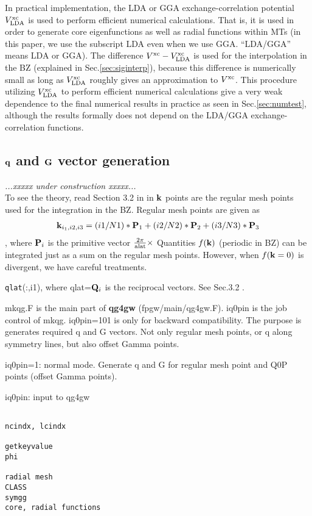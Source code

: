 \documentclass[a4paper,10pt,epsf,fleqn]{article}
\def\vxc{V^{\rm xc}}
\def\bfP{{\bf P}}
\def\underconstruction{{\it...xxxxx under construction xxxxx...\\}}
\newcommand{\bfq}{{\bf q}}
\newcommand{\bfk}{{\bf k}}
\newcommand{\bfQ}{{\bf Q}}
\newcommand{\bfG}{{\bf G}}
\newcommand{\exe}[1]{{\bf #1}}
\newcommand{\raw}[1]{{\tt #1}}
\newcommand{\qlat}{{\raw{qlat}}}
\begin{document}
In practical implementation, the LDA or GGA exchange-correlation
potential $V^{\rm xc}_{\rm LDA}$ is used to perform efficient numerical calculations.
That is, it is used in order to generate core eigenfunctions as well as radial functions within MTs
(in this paper, we use the subscript LDA even when we use GGA. ``LDA/GGA'' means LDA or GGA).
The difference $\vxc-V^{\rm xc}_{\rm LDA}$ is used 
for the interpolation in the BZ (explained in Sec.\ref{sec:siginterp}),
because this difference is numerically small as long as 
$V^{\rm xc}_{\rm LDA}$ roughly gives an approximation to $\vxc$.
This procedure utilizing $V^{\rm xc}_{\rm LDA}$ to perform efficient numerical calculations
give a very weak dependence to the final numerical results in practice as seen in Sec.\ref{sec:numtest},
although the results formally does not depend on the LDA/GGA exchange-correlation functions.


\subsection{$\bfq$ and $\bfG$ vector generation}
\underconstruction
To see the theory, read Section 3.2 in in \cite{kotani_quasiparticle_2014}
$\bfk$ points are the regular mesh points used for the integration
in the BZ. Regular mesh points are given as
\begin{eqnarray}
\bfk_{i_1,i2,i3}=(i1/N1)*\bfP_1+(i2/N2)*\bfP_2+(i3/N3)*\bfP_3
\end{eqnarray}
, where $\bfP_i$ is the primitive vector $\frac{2\pi}{\rm alat} \times$
Quantities $f(\bfk)$ (periodic in BZ) can
be integrated just as a sum on the regular mesh points.
However, when  $f(\bfk=0)$ is divergent, we have careful treatments.

\qlat(:,i1), where qlat=$\bfQ_i$ is the reciprocal vectors.
See Sec.3.2 .

mkqg.F is the main part of \exe{qg4gw} (fpgw/main/qg4gw.F).
iq0pin is the job control of mkqg. iq0pin=101 is only for backward compatibility. 
The purpose is generates required q and G vectors.
Not only regular mesh points, or q along symmetry lines, 
but also offset Gamma points.

iq0pin=1: normal mode. Generate q and G for regular mesh point and Q0P
points (offset Gamma points).

iq0pin: input to qg4gw

\begin{verbatim}

ncindx, lcindx

getkeyvalue
phi

radial mesh
CLASS
symgg
core, radial functions

\end{verbatim}
\end{document}
